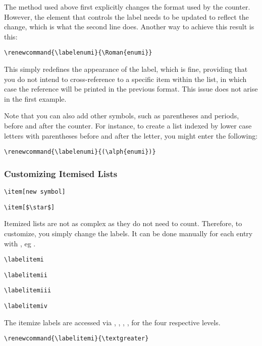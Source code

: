 The method used above first explicitly changes the format used by the counter.
However, the element that controls the label needs to be updated to reflect the
change, which is what the second line does. Another way to achieve this result
is this:
\begin{lstlisting}
\renewcommand{\labelenumi}{\Roman{enumi}}
\end{lstlisting}

This simply redefines the appearance of the label, which is fine, providing
that you do not intend to cross-reference to a specific item within the list,
in which case the reference will be printed in the previous format. This issue
does not arise in the first example.

Note that you can also add other symbols, such as parentheses and periods,
before and after the counter.  For instance, to create a list indexed by lower
case letters with parentheses before and after the letter, you might enter the
following:
\begin{lstlisting}
\renewcommand{\labelenumi}{(\alph{enumi})}
\end{lstlisting}

\subsubsection{Customizing Itemised Lists}
\begin{lstlisting}
\item[new symbol]
\end{lstlisting}
\begin{lstlisting}
\item[$\star$]
\end{lstlisting}
 Itemized lists are not as complex as they do not need to count. Therefore, to
customize, you simply change the labels. It can be done manually for each entry
with , eg . 

\begin{lstlisting}
\labelitemi
\end{lstlisting}
\begin{lstlisting}
\labelitemii
\end{lstlisting}
\begin{lstlisting}
\labelitemiii
\end{lstlisting}
\begin{lstlisting}
\labelitemiv
\end{lstlisting}
The itemize labels are accessed via , , , , for the four respective levels.
\begin{lstlisting}
\renewcommand{\labelitemi}{\textgreater}
\end{lstlisting}

